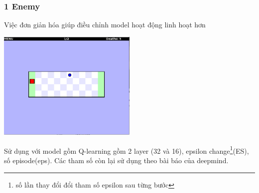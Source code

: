\documentclass[12pt,a4paper]{article}
\begin{document}
\subsubsection{1 Enemy}
Việc đơn giản hóa giúp điều chỉnh model hoạt động linh hoạt hơn\\
\begin{center}
\includegraphics[width=0.5\textwidth]{photo/ThesisRES/1eUp.png}\\
\end{center}
Sử dụng với model gồm Q-learning gồm 2 layer (32 và 16), epsilon change\footnote{số lần thay đổi đổi tham số epsilon sau từng bước}(ES), số episode(eps). Các tham số còn lại sử dụng theo bài báo của deepmind.
\end{document}
